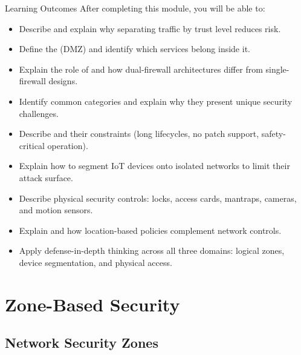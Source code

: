 \documentclass[aspectratio=169]{beamer}  %
\begin{document}
\begin{frame}[t,allowframebreaks]{Learning Outcomes}
    After completing this module, you will be able to:
    \vspace{0.5em}
    \small
    \begin{itemize}
        \item Describe  and explain why separating traffic by trust level reduces risk.
        \item Define the  (DMZ) and identify which services belong inside it.
        \item Explain the role of  and how dual-firewall architectures differ from single-firewall designs.
        \item Identify common  categories and explain why they present unique security challenges.
        \item Describe  and their constraints (long lifecycles, no patch support, safety-critical operation).
        \item Explain how to segment IoT devices onto isolated networks to limit their attack surface.
        \item Describe physical security controls: locks, access cards, mantraps, cameras, and motion sensors.
        \item Explain  and how location-based policies complement network controls.
        \item Apply defense-in-depth thinking across all three domains: logical zones, device segmentation, and physical access.
    \end{itemize}
\end{frame}

\section{Zone-Based Security}
\subsection{Network Security Zones}

\end{document}
